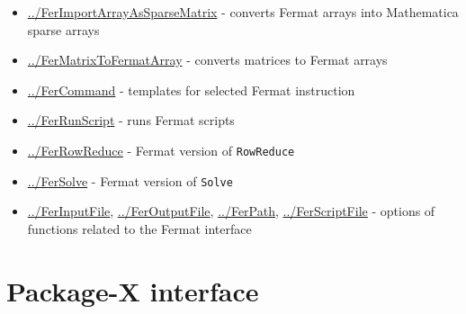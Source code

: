 \documentclass[../FeynHelpersManual.tex]{subfiles}
\begin{document}
\begin{itemize}
\tightlist
\item
  \hyperlink{../ferimportarrayassparsematrix}{../FerImportArrayAsSparseMatrix}
  - converts Fermat arrays into Mathematica sparse arrays
\item
  \hyperlink{../fermatrixtofermatarray}{../FerMatrixToFermatArray} -
  converts matrices to Fermat arrays
\item
  \hyperlink{../fercommand}{../FerCommand} - templates for selected
  Fermat instruction
\item
  \hyperlink{../ferrunscript}{../FerRunScript} - runs Fermat scripts
\item
  \hyperlink{../ferrowreduce}{../FerRowReduce} - Fermat version of
  \texttt{RowReduce}
\item
  \hyperlink{../fersolve}{../FerSolve} - Fermat version of
  \texttt{Solve}
\item
  \hyperlink{../ferinputfile}{../FerInputFile},
  \hyperlink{../feroutputfile}{../FerOutputFile},
  \hyperlink{../ferpath}{../FerPath},
  \hyperlink{../ferscriptfile}{../FerScriptFile} - options of functions
  related to the Fermat interface
\end{itemize}

\hypertarget{package-x interface}{
\section{Package-X interface}\label{package-x interface}}
\end{document}
